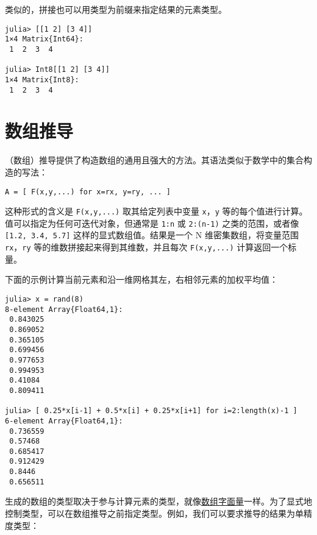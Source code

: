 类似的，拼接也可以用类型为前缀来指定结果的元素类型。




\begin{verbatim}
julia> [[1 2] [3 4]]
1×4 Matrix{Int64}:
 1  2  3  4

julia> Int8[[1 2] [3 4]]
1×4 Matrix{Int8}:
 1  2  3  4
\end{verbatim}



\hypertarget{12661687782855472919}{}


\section{数组推导}



（数组）推导提供了构造数组的通用且强大的方法。其语法类似于数学中的集合构造的写法：




\begin{lstlisting}
A = [ F(x,y,...) for x=rx, y=ry, ... ]
\end{lstlisting}



这种形式的含义是 \texttt{F(x,y,...)} 取其给定列表中变量 \texttt{x}，\texttt{y} 等的每个值进行计算。值可以指定为任何可迭代对象，但通常是 \texttt{1:n} 或 \texttt{2:(n-1)} 之类的范围，或者像 \texttt{[1.2, 3.4, 5.7]} 这样的显式数组值。结果是一个 N 维密集数组，将变量范围 \texttt{rx}，\texttt{ry} 等的维数拼接起来得到其维数，并且每次 \texttt{F(x,y,...)} 计算返回一个标量。



下面的示例计算当前元素和沿一维网格其左，右相邻元素的加权平均值：




\begin{verbatim}
julia> x = rand(8)
8-element Array{Float64,1}:
 0.843025
 0.869052
 0.365105
 0.699456
 0.977653
 0.994953
 0.41084
 0.809411

julia> [ 0.25*x[i-1] + 0.5*x[i] + 0.25*x[i+1] for i=2:length(x)-1 ]
6-element Array{Float64,1}:
 0.736559
 0.57468
 0.685417
 0.912429
 0.8446
 0.656511
\end{verbatim}



生成的数组的类型取决于参与计算元素的类型，就像\hyperlink{13961675686342166416}{数组字面量}一样。为了显式地控制类型，可以在数组推导之前指定类型。例如，我们可以要求推导的结果为单精度类型：




